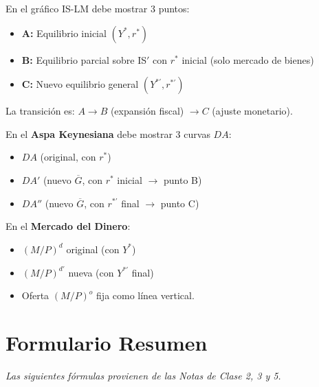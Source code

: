 \documentclass[11pt,a4paper]{article}
\newcommand{\barvar}[1]{\overline{#1}}
\begin{document}
\begin{hintbox}
En el gr\'{a}fico IS-LM debe mostrar 3 puntos:
\begin{itemize}[leftmargin=1.5em, itemsep=2pt]
    \item \textbf{A:} Equilibrio inicial $(Y^*, r^*)$
    \item \textbf{B:} Equilibrio parcial sobre IS$'$ con $r^*$ inicial (solo mercado de bienes)
    \item \textbf{C:} Nuevo equilibrio general $(Y^{*\prime}, r^{*\prime})$
\end{itemize}
La transici\'{o}n es: $A \rightarrow B$ (expansi\'{o}n fiscal) $\rightarrow C$ (ajuste monetario).

\vspace{0.3cm}
En el \textbf{Aspa Keynesiana} debe mostrar 3 curvas $DA$:
\begin{itemize}[leftmargin=1.5em, itemsep=2pt]
    \item $DA$ \;(original, con $r^*$)
    \item $DA'$ \;(nuevo $\barvar{G}$, con $r^*$ inicial $\rightarrow$ punto B)
    \item $DA''$ \;(nuevo $\barvar{G}$, con $r^{*\prime}$ final $\rightarrow$ punto C)
\end{itemize}

\vspace{0.3cm}
En el \textbf{Mercado del Dinero}:
\begin{itemize}[leftmargin=1.5em, itemsep=2pt]
    \item $(M/P)^d$ \;original (con $Y^*$)
    \item $(M/P)^{d\prime}$ \;nueva (con $Y^{*\prime}$ final)
    \item Oferta $(M/P)^o$ fija como l\'{i}nea vertical.
\end{itemize}
\end{hintbox}


\newpage
\section{Formulario Resumen}

\noindent\textit{\small Las siguientes f\'{o}rmulas provienen de las Notas de Clase 2, 3 y 5.}

\vspace{0.4cm}
\end{document}
